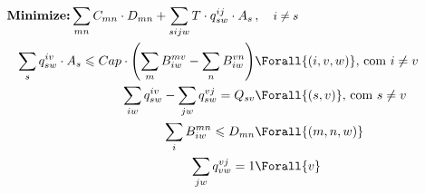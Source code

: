




$$
\begin{aligned}
\mbox{\textbf{Minimize:}}\sum_{mn} C_{mn}\cdot D_{mn} + \sum_{sijw} T\cdot q_{sw}^{ij}\cdot A_s \,&,\quad \mbox{\small$i\neq s$}\\
\sum_{s} q_{sw}^{iv}\cdot A_s \leqslant Cap\cdot \left(\sum_{m} B_{iw}^{mv} - \sum_{n} B_{iw}^{vn}\right) &\Forall{(i,v,w)} \mbox{, com $i\neq v$}\\
\sum_{iw} q_{sw}^{iv} - \sum_{jw} q_{sw}^{vj} = Q_{sv} &\Forall{(s,v)} \mbox{, com $s\neq v$}\\
\sum_i B_{iw}^{mn} \leqslant D_{mn} &\Forall{(m,n,w)}\\
\sum_{jw} q_{vw}^{vj} = 1 &\Forall{v} 
\end{aligned}
$$

 




